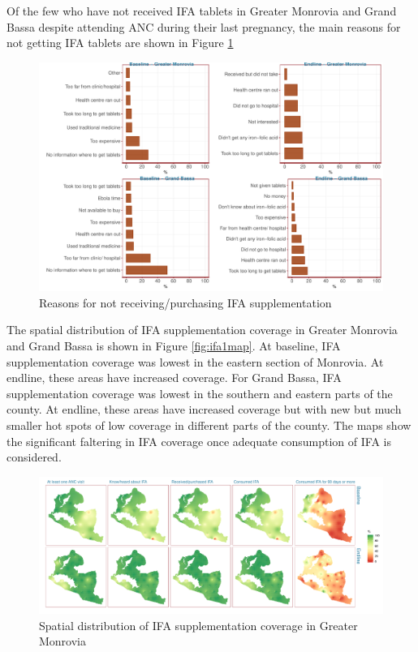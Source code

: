 \documentclass[12pt,a4paper]{article}
\begin{document}
Of the few who have not received IFA tablets in Greater Monrovia and Grand Bassa despite attending ANC during their last pregnancy, the main reasons for not getting IFA tablets are shown in Figure \ref{fig:ifa2plot}

\begin{figure}[H]

{\centering \includegraphics{liberiaCoverageFinalReport_files/figure-latex/ifa2plot-1} 

}

\caption{Reasons for not receiving/purchasing IFA supplementation}\label{fig:ifa2plot}
\end{figure}

The spatial distribution of IFA supplementation coverage in Greater Monrovia and Grand Bassa is shown in Figure \ref{fig:ifa1map}. At baseline, IFA supplementation coverage was lowest in the eastern section of Monrovia. At endline, these areas have increased coverage. For Grand Bassa, IFA supplementation coverage was lowest in the southern and eastern parts of the county. At endline, these areas have increased coverage but with new but much smaller hot spots of low coverage in different parts of the county. The maps show the significant faltering in IFA coverage once adequate consumption of IFA is considered.

\begin{figure}[H]

{\centering \includegraphics{liberiaCoverageFinalReport_files/figure-latex/ifa1Map-1} 

}

\caption{Spatial distribution of IFA supplementation coverage in Greater Monrovia}\label{fig:ifa1Map}
\end{figure}
\end{document}
